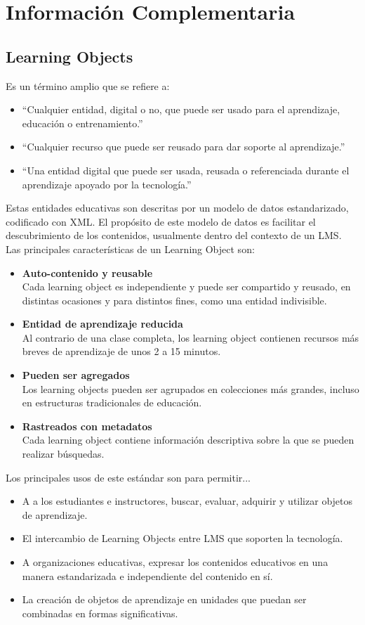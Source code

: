 \chapter{Información Complementaria}
\section{Learning Objects}
Es un término amplio que se refiere a:

\begin{itemize}
	\item ``Cualquier entidad, digital o no, que puede ser usado para el aprendizaje, educación o entrenamiento.''
	\item ``Cualquier recurso que puede ser reusado para dar soporte al aprendizaje.''
	\item ``Una entidad digital que puede ser usada, reusada o referenciada durante el aprendizaje apoyado por la tecnología.'' 
\end{itemize}

Estas entidades educativas son descritas por un modelo de datos estandarizado, codificado con XML. El propósito de este modelo de datos es facilitar el descubrimiento de los contenidos, usualmente dentro del contexto de un LMS.\\

Las principales características de un Learning Object son:
\begin{itemize}
	\item \textbf{Auto-contenido y reusable}\\
	Cada learning object es independiente y puede ser compartido y reusado, en distintas ocasiones y para distintos fines, como una entidad indivisible.
	\item \textbf{Entidad de aprendizaje reducida}\\
	Al contrario de una clase completa, los learning object contienen recursos más breves de aprendizaje de unos 2 a 15 minutos.
	\item \textbf{Pueden ser agregados}\\
	Los learning objects pueden ser agrupados en colecciones más grandes, incluso en estructuras tradicionales de educación.
	\item \textbf{Rastreados con metadatos}\\
	Cada learning object contiene información descriptiva sobre la que se pueden realizar búsquedas.
\end{itemize}

Los principales usos de este estándar son para permitir...
\begin{itemize}
	\item A a los estudiantes e instructores, buscar, evaluar, adquirir y utilizar objetos de aprendizaje.
	\item El intercambio de Learning Objects entre LMS que soporten la tecnología.
	\item A organizaciones educativas, expresar los contenidos educativos en una manera estandarizada e independiente del contenido en sí.
	\item La creación de objetos de aprendizaje en unidades que puedan ser combinadas en formas significativas.
\end{itemize}
\citep{IEEE_LOM}